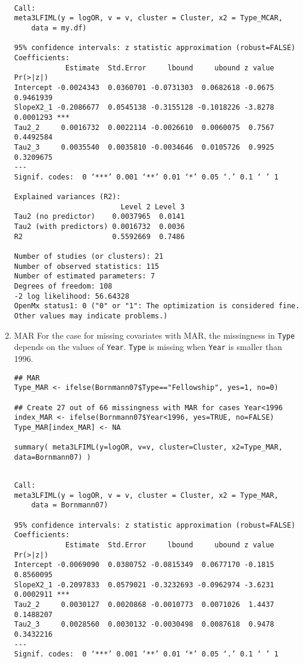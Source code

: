 \documentclass[11pt]{article}
\begin{document}
\begin{enumerate}
\begin{verbatim}

Call:
meta3LFIML(y = logOR, v = v, cluster = Cluster, x2 = Type_MCAR, 
    data = my.df)

95% confidence intervals: z statistic approximation (robust=FALSE)
Coefficients:
            Estimate  Std.Error     lbound     ubound z value  Pr(>|z|)    
Intercept -0.0024343  0.0360701 -0.0731303  0.0682618 -0.0675 0.9461939    
SlopeX2_1 -0.2086677  0.0545138 -0.3155128 -0.1018226 -3.8278 0.0001293 ***
Tau2_2     0.0016732  0.0022114 -0.0026610  0.0060075  0.7567 0.4492584    
Tau2_3     0.0035540  0.0035810 -0.0034646  0.0105726  0.9925 0.3209675    
---
Signif. codes:  0 ‘***’ 0.001 ‘**’ 0.01 ‘*’ 0.05 ‘.’ 0.1 ‘ ’ 1

Explained variances (R2):
                         Level 2 Level 3
Tau2 (no predictor)    0.0037965  0.0141
Tau2 (with predictors) 0.0016732  0.0036
R2                     0.5592669  0.7486

Number of studies (or clusters): 21
Number of observed statistics: 115
Number of estimated parameters: 7
Degrees of freedom: 108
-2 log likelihood: 56.64328 
OpenMx status1: 0 ("0" or "1": The optimization is considered fine.
Other values may indicate problems.)
\end{verbatim}

\item MAR
\label{sec:orgdaa0287}
For the case for missing covariates with MAR, the missingness in \texttt{Type} depends on the values of \texttt{Year}. \texttt{Type} is missing when \texttt{Year} is smaller than 1996. 
\begin{verbatim}
## MAR
Type_MAR <- ifelse(Bornmann07$Type=="Fellowship", yes=1, no=0)

## Create 27 out of 66 missingness with MAR for cases Year<1996
index_MAR <- ifelse(Bornmann07$Year<1996, yes=TRUE, no=FALSE)
Type_MAR[index_MAR] <- NA

summary( meta3LFIML(y=logOR, v=v, cluster=Cluster, x2=Type_MAR, data=Bornmann07) ) 
\end{verbatim}

\begin{verbatim}

Call:
meta3LFIML(y = logOR, v = v, cluster = Cluster, x2 = Type_MAR, 
    data = Bornmann07)

95% confidence intervals: z statistic approximation (robust=FALSE)
Coefficients:
            Estimate  Std.Error     lbound     ubound z value  Pr(>|z|)    
Intercept -0.0069090  0.0380752 -0.0815349  0.0677170 -0.1815 0.8560095    
SlopeX2_1 -0.2097833  0.0579021 -0.3232693 -0.0962974 -3.6231 0.0002911 ***
Tau2_2     0.0030127  0.0020868 -0.0010773  0.0071026  1.4437 0.1488207    
Tau2_3     0.0028560  0.0030132 -0.0030498  0.0087618  0.9478 0.3432216    
---
Signif. codes:  0 ‘***’ 0.001 ‘**’ 0.01 ‘*’ 0.05 ‘.’ 0.1 ‘ ’ 1


\end{verbatim}
\end{enumerate}
\end{document}
